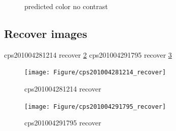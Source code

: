 \documentclass[11pt]{scrartcl} %
\begin{document}
\begin{figure}[H]
	\centering  %
	\caption{predicted color no contrast}
	\label{predicted color no contrast surface plot}
\end{figure}

\subsection{Recover images}

cps201004281214 recover \ref{cps201004281214_recover}
cps201004291795 recover \ref{cps201004291795_recover}
\begin{figure}[h] %
	\centering
	\texttt{[image: Figure/cps201004281214\_recover]} %
	\caption{cps201004281214 recover}
	\label{cps201004281214_recover}
\end{figure}

\begin{figure}[h] %
	\centering
	\texttt{[image: Figure/cps201004291795\_recover]} %
	\caption{cps201004291795 recover}
	\label{cps201004291795_recover}
\end{figure}
\end{document}
